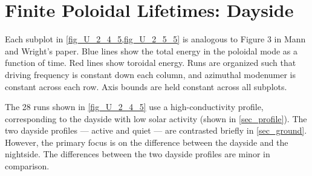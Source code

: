 






\section{Finite Poloidal Lifetimes: Dayside}
  \label{sec_lifetimes_day}

Each subplot in \cref{fig_U_2_4_5,fig_U_2_5_5} is analogous to Figure 3 in Mann and Wright's paper\cite{mann_1995}. Blue lines show the total energy in the poloidal mode as a function of time. Red lines show toroidal energy. Runs are organized such that driving frequency is constant down each column, and azimuthal modenumer is constant across each row. Axis bounds are held constant across all subplots. 

The 28 runs shown in \cref{fig_U_2_4_5} use a high-conductivity profile, corresponding to the dayside with low solar activity (shown in \cref{sec_profile}). The two dayside profiles --- active and quiet --- are contrasted briefly in \cref{sec_ground}. However, the primary focus is on the difference between the dayside and the nightside. The differences between the two dayside profiles are minor in comparison. 

